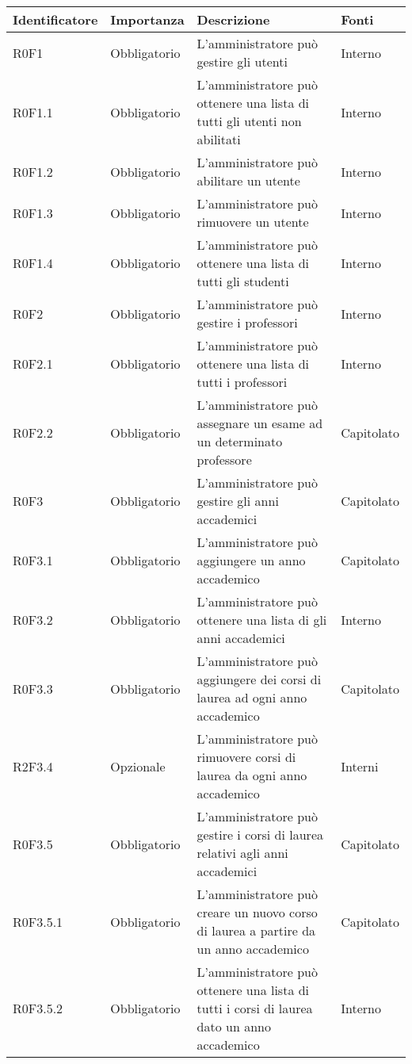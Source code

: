 \documentclass[AnalisiDeiRequisiti.tex]{subfiles}
\begin{document}
\label{table:Tabella requisiti funzionali}
\begin{longtable}[H]{|p{2.5cm}|p{2.5cm}|p{5cm}|p{2cm}|}
	\hline
	\rowcolor[HTML]{38FFF8} 
	\textbf{Identificatore} & \textbf{Importanza} & \textbf{Descrizione} & \textbf{Fonti} \\ \hline
	\endhead
	R0F1 & Obbligatorio & L'amministratore può gestire gli utenti & Interno \\ \hline
	R0F1.1 & Obbligatorio & L'amministratore può ottenere una lista di tutti gli utenti non abilitati & Interno \\ \hline
	R0F1.2 & Obbligatorio & L'amministratore può abilitare un utente & Interno \\ \hline
	R0F1.3 & Obbligatorio & L'amministratore può rimuovere un utente & Interno \\ \hline
	R0F1.4 & Obbligatorio & L'amministratore può ottenere una lista di tutti gli studenti & Interno \\ \hline
	R0F2 & Obbligatorio & L'amministratore può gestire i professori & Interno \\ \hline
	R0F2.1 & Obbligatorio & L'amministratore può ottenere una lista di tutti i professori & Interno \\ \hline
	R0F2.2 & Obbligatorio & L'amministratore può assegnare un esame ad un determinato professore & Capitolato \\ \hline
	R0F3 & Obbligatorio & L'amministratore può gestire gli anni accademici & Capitolato \\ \hline
	R0F3.1 & Obbligatorio & L'amministratore può aggiungere un anno accademico & Capitolato \\ \hline
	R0F3.2 & Obbligatorio & L'amministratore può ottenere una lista di gli anni accademici & Interno \\ \hline
	R0F3.3 & Obbligatorio & L'amministratore può aggiungere dei corsi di laurea ad ogni anno accademico & Capitolato \\ \hline
	R2F3.4 & Opzionale & L'amministratore può rimuovere corsi di laurea da ogni anno accademico & Interni \\ \hline
	R0F3.5 & Obbligatorio & L'amministratore può gestire i corsi di laurea relativi agli anni accademici & Capitolato \\ \hline
	R0F3.5.1 & Obbligatorio & L'amministratore può creare un nuovo corso di laurea a partire da un anno accademico & Capitolato \\ \hline
	R0F3.5.2 & Obbligatorio & L'amministratore può ottenere una lista di tutti i corsi di laurea dato un anno accademico & Interno \\ \hline

\end{longtable}
\end{document}
